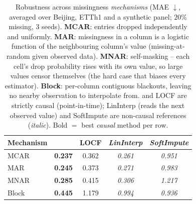 \begin{table}[t]\centering\small
\setlength{\tabcolsep}{5pt}
\caption{Robustness across missingness \emph{mechanisms} (MAE $\downarrow$, averaged over Beijing, ETTh1 and a synthetic panel; $20\%$ missing, 3 seeds). \textbf{MCAR}: entries dropped independently and uniformly. \textbf{MAR}: missingness in a column is a logistic function of the neighbouring column's value (missing-at-random given observed data). \textbf{MNAR}: self-masking -- each cell's drop probability rises with its own value, so large values censor themselves (the hard case that biases every estimator). \textbf{Block}: per-column contiguous blackouts, leaving no nearby observation to interpolate from. \cafe{} and LOCF are strictly causal (point-in-time); LinInterp (reads the next observed value) and SoftImpute are non-causal references (\emph{italic}). Bold $=$ best \emph{causal} method per row.}
\label{tab:mnar}
\begin{tabular}{@{}lcccc@{}}
\toprule
Mechanism & \cafe{} & LOCF & \textit{LinInterp} & \textit{SoftImpute} \\
\midrule
MCAR & \textbf{0.237} & 0.362 & \textit{0.261} & \textit{0.951} \\
MAR & \textbf{0.245} & 0.373 & \textit{0.271} & \textit{0.983} \\
MNAR & \textbf{0.285} & 0.415 & \textit{0.306} & \textit{1.217} \\
Block & \textbf{0.445} & 1.179 & \textit{0.994} & \textit{0.936} \\
\bottomrule
\end{tabular}
\end{table}
